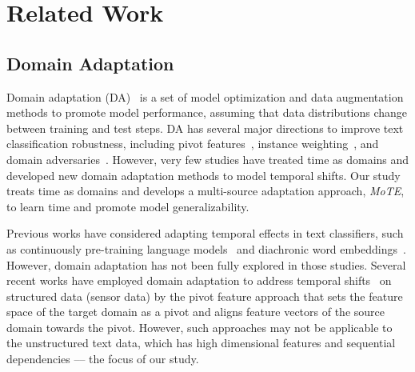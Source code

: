 \section{Related Work}


\subsection{Domain Adaptation}


Domain adaptation (DA)~\cite{daume2006domain,blitzer2006domain,ben2010theory,farahani2021brief} is a set of model optimization and data augmentation methods to promote model performance, assuming that data distributions change between training and test steps.
DA has several major directions to improve text classification robustness, including pivot features~\cite{blitzer2006domain,li2022cross}, instance weighting~\cite{jiang2007instance,Lv2023Review}, and domain adversaries~\cite{Ganin2015Unsupervised,Kong2024Unsupervised,zeng2024Unsupervised}. 
However, very few studies have treated time as domains and developed new domain adaptation methods to model temporal shifts.
Our study treats time as domains and develops a multi-source adaptation approach, \textit{MoTE}, to learn time and promote model generalizability.


Previous works have considered adapting temporal effects in text classifiers, such as continuously pre-training language models~\cite{rottger2021temporal, agarwal2022temporal, shang2022improving} and diachronic word embeddings~\cite{huang2019neural, rajaby2021time,dhingra2022time}. 
However, domain adaptation has not been fully explored in those studies.
Several recent works have employed domain adaptation to address temporal shifts~\cite{he2023domain,ott2022domain} on structured data (sensor data) by the pivot feature approach that sets the feature space of the target domain as a pivot and aligns feature vectors of the source domain towards the pivot.
However, such approaches may not be applicable to the unstructured text data, which has high dimensional features and sequential dependencies –– the focus of our study.

